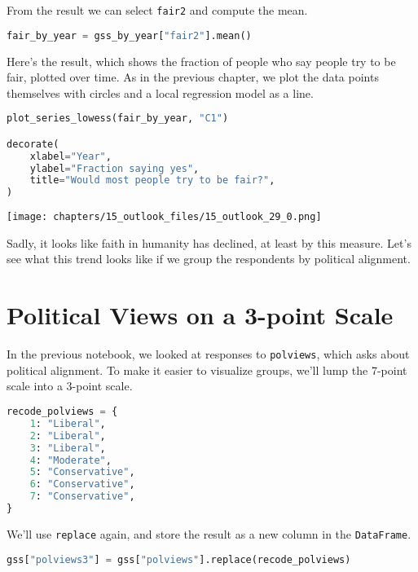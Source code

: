 From the result we can select \passthrough{\lstinline!fair2!} and
compute the mean.

\begin{lstlisting}[language=Python,style=source]
fair_by_year = gss_by_year["fair2"].mean()
\end{lstlisting}

Here's the result, which shows the fraction of people who say people try
to be fair, plotted over time. As in the previous chapter, we plot the
data points themselves with circles and a local regression model as a
line.

\begin{lstlisting}[language=Python,style=source]
plot_series_lowess(fair_by_year, "C1")

decorate(
    xlabel="Year",
    ylabel="Fraction saying yes",
    title="Would most people try to be fair?",
)
\end{lstlisting}

\begin{center}
\texttt{[image: chapters/15\_outlook\_files/15\_outlook\_29\_0.png]}
\end{center}

Sadly, it looks like faith in humanity has declined, at least by this
measure. Let's see what this trend looks like if we group the
respondents by political alignment.

\section{Political Views on a 3-point
Scale}\label{political-views-on-a-3-point-scale}

In the previous notebook, we looked at responses to
\passthrough{\lstinline!polviews!}, which asks about political
alignment. To make it easier to visualize groups, we'll lump the 7-point
scale into a 3-point scale.

\begin{lstlisting}[language=Python,style=source]
recode_polviews = {
    1: "Liberal",
    2: "Liberal",
    3: "Liberal",
    4: "Moderate",
    5: "Conservative",
    6: "Conservative",
    7: "Conservative",
}
\end{lstlisting}

We'll use \passthrough{\lstinline!replace!} again, and store the result
as a new column in the \passthrough{\lstinline!DataFrame!}.

\begin{lstlisting}[language=Python,style=source]
gss["polviews3"] = gss["polviews"].replace(recode_polviews)
\end{lstlisting}

